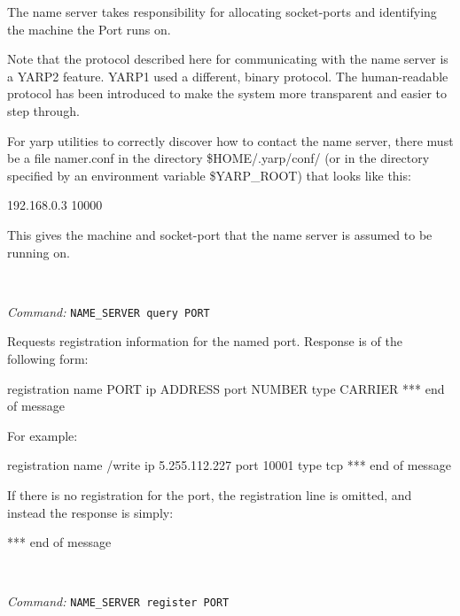 \documentclass[a4]{article}
\newenvironment{packed_itemize}{
\begin{itemize}
  \renewcommand{\labelitemi}{$\triangleright$}
  \setlength{\itemsep}{1pt}
  \setlength{\parskip}{0pt}
  \setlength{\parsep}{0pt}
}{\end{itemize}}
\newcommand{\newusage}{\ \\\noindent\makebox[\textwidth]{\hrulefill}}
\newcommand{\usage}[1]{ \begin{packed_itemize} \item {\it Command:} {\tt #1} \end{packed_itemize}}
\begin{document}
The name server takes responsibility for allocating
socket-ports and identifying the machine the Port runs on.

Note that the protocol described here for communicating with the name
server is a YARP2 feature.  YARP1 used a different, binary protocol.
The human-readable protocol has been introduced to make the system
more transparent and easier to step through.

For yarp utilities to correctly discover how
to contact the name server,
there must be a file namer.conf in the directory \$HOME/.yarp/conf/
(or in the directory specified by an environment variable \$YARP\_ROOT)
that looks like this:
\begin{code}
192.168.0.3 10000
\end{code}
This gives the machine and socket-port that the name server is assumed
to be running on.




\newusage{}
\usage{NAME\_SERVER query PORT}
Requests registration information for the named port.  Response is of 
the following form:
\begin{code}
registration name PORT ip ADDRESS port NUMBER type CARRIER
*** end of message
\end{code}
For example:
\begin{code}
registration name /write ip 5.255.112.227 port 10001 type tcp
*** end of message
\end{code}
If there is no registration for the port, the registration line
is omitted, and instead the response is simply:
\begin{code}
*** end of message
\end{code}


\newusage{}
\usage{NAME\_SERVER register PORT}
\end{document}

